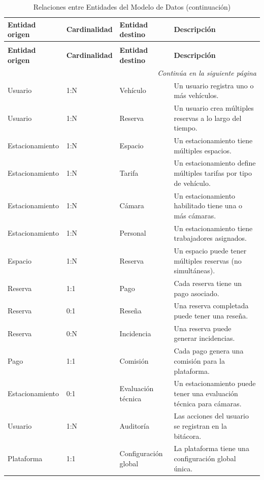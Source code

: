 \begin{longtable}{p{3cm} p{2cm} p{3cm} p{6cm}}
\caption{Relaciones entre Entidades del Modelo de Datos} \\
\toprule
\textbf{Entidad origen} & \textbf{Cardinalidad} & \textbf{Entidad destino} & \textbf{Descripción} \\
\midrule
\endfirsthead

\caption[]{Relaciones entre Entidades del Modelo de Datos (continuación)} \\
\toprule
\textbf{Entidad origen} & \textbf{Cardinalidad} & \textbf{Entidad destino} & \textbf{Descripción} \\
\midrule
\endhead

\midrule
\multicolumn{4}{r}{\footnotesize\textit{Continúa en la siguiente página}} \\
\endfoot

\bottomrule
\endlastfoot

Usuario & 1:N & Vehículo & Un usuario registra uno o más vehículos. \\
\midrule
Usuario & 1:N & Reserva & Un usuario crea múltiples reservas a lo largo del tiempo. \\
\midrule
Estacionamiento & 1:N & Espacio & Un estacionamiento tiene múltiples espacios. \\
\midrule
Estacionamiento & 1:N & Tarifa & Un estacionamiento define múltiples tarifas por tipo de vehículo. \\
\midrule
Estacionamiento & 1:N & Cámara & Un estacionamiento habilitado tiene una o más cámaras. \\
\midrule
Estacionamiento & 1:N & Personal & Un estacionamiento tiene trabajadores asignados. \\
\midrule
Espacio & 1:N & Reserva & Un espacio puede tener múltiples reservas (no simultáneas). \\
\midrule
Reserva & 1:1 & Pago & Cada reserva tiene un pago asociado. \\
\midrule
Reserva & 0:1 & Reseña & Una reserva completada puede tener una reseña. \\
\midrule
Reserva & 0:N & Incidencia & Una reserva puede generar incidencias. \\
\midrule
Pago & 1:1 & Comisión & Cada pago genera una comisión para la plataforma. \\
\midrule
Estacionamiento & 0:1 & Evaluación técnica & Un estacionamiento puede tener una evaluación técnica para cámaras. \\
\midrule
Usuario & 1:N & Auditoría & Las acciones del usuario se registran en la bitácora. \\
\midrule
Plataforma & 1:1 & Configuración global & La plataforma tiene una configuración global única. \\
\end{longtable}


